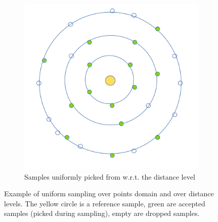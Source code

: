 \begin{figure}
\begin{center}
\begin{subfigure}[b]{0.48\textwidth}
			\includegraphics[width=\textwidth]{figures/SampleDistrOverLeveDist.png}
			\caption{Samples uniformly picked from w.r.t. the distance level}
		\end{subfigure}

	\end{center}
	\caption{Example of uniform sampling over points domain and over distance levels. The yellow circle is a reference sample, green are accepted samples (picked during sampling), empty are dropped samples.}
	\label{fig:samples_distribution}
\end{figure}


